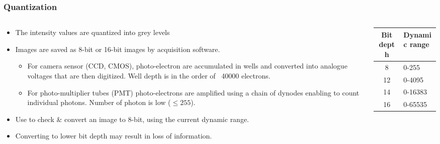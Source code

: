 \documentclass[ignorenonframetext,aspectratio=169,10pt,xcolor=table]{beamer}
\begin{document}
\begin{frame} \frametitle{Quantization}

  \begin{columns}

    \begin{column}{0.7\textwidth}
      \begin{itemize} \setlength\itemsep{1em}
      \item The intensity values are quantized into grey levels
      \item Images are saved as 8-bit or 16-bit images by acquisition
        software.
        \begin{itemize}
        \item For camera sensor (CCD, CMOS), photo-electron are
          accumulated in wells and converted into analogue voltages that are
          then digitized. Well depth is in the order of ~40000 electrons.
        \item For photo-multiplier tubes (PMT) photo-electrons are
          amplified using a chain of dynodes enabling to count individual
          photons. Number of photon is low ($\leq 255$).
        \end{itemize}
      \end{itemize}
      \begin{itemize}
      \item Use  to check \& convert an image
        to 8-bit, using the current dynamic range.
      \item Converting to lower bit depth may result in loss of information.
      \end{itemize}
    \end{column}

    \begin{column}{0.3\textwidth}
      \begin{center} \small {}
        \begin{tabular}{cl}
          Bit depth & Dynamic range \\ \hline 8 &
          0-255 \\ 12 & 0-4095\\ 14 & 0-16383\\ 16 & 0-65535
        \end{tabular}
      \end{center}

    \end{column}

  \end{columns}

\end{frame}
\end{document}
